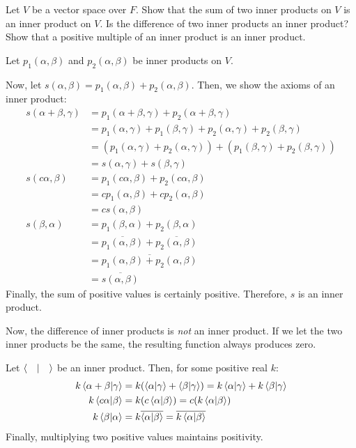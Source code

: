 \documentclass[notes]{agony}
\begin{document}
\begin{xca}
  Let $V$ be a vector space over $F$.
  Show that the sum of two inner products on $V$ is an inner product on $V$.
  Is the difference of two inner products an inner product?
  Show that a positive multiple of an inner product is an inner product.
\end{xca}
\begin{prf}
  Let $p_1(\alpha,\beta)$ and $p_2(\alpha,\beta)$ be inner products on $V$.

  Now, let $s(\alpha,\beta) = p_1(\alpha, \beta) + p_2(\alpha, \beta)$.
  Then, we show the axioms of an inner product:
  \begin{align*}
    s(\alpha+\beta,\gamma)
     & = p_1(\alpha+\beta,\gamma)+p_2(\alpha+\beta,\gamma)                                   \\
     & = p_1(\alpha,\gamma) + p_1(\beta,\gamma) + p_2(\alpha,\gamma) + p_2(\beta,\gamma)     \\
     & = (p_1(\alpha,\gamma) + p_2(\alpha,\gamma)) + (p_1(\beta,\gamma) + p_2(\beta,\gamma)) \\
     & = s(\alpha,\gamma) + s(\beta,\gamma)                                                  \\
    s(c\alpha, \beta)
     & = p_1(c\alpha, \beta) + p_2(c\alpha, \beta)                                           \\
     & = cp_1(\alpha,\beta) + cp_2(\alpha,\beta)                                             \\
     & = cs(\alpha,\beta)                                                                    \\
    s(\beta,\alpha)
     & = p_1(\beta,\alpha) + p_2(\beta,\alpha)                                               \\
     & = \overline{p_1(\alpha,\beta)} + \overline{p_2(\alpha,\beta)}                         \\
     & = \overline{p_1(\alpha,\beta) + p_2(\alpha,\beta)}                                    \\
     & = \overline{s(\alpha,\beta)}
  \end{align*}
  Finally, the sum of positive values is certainly positive.
  Therefore, $s$ is an inner product.

  Now, the difference of inner products is \emph{not} an inner product.
  If we let the two inner products be the same, the resulting function always produces zero.

  Let $\ip{\quad}$ be an inner product.
  Then, for some positive real $k$:
  \begin{align*}
    k\ip{\alpha+\beta}{\gamma} & = k(\ip{\alpha}{\gamma}+\ip{\beta}{\gamma}) = k\ip{\alpha}{\gamma} + k\ip{\beta}{\gamma} \\
    k\ip{c\alpha}{\beta}       & = k(c\ip{\alpha}{\beta}) = c(k\ip{\alpha}{\beta})                                        \\
    k\ip{\beta}{\alpha}        & = k\overline{\ip{\alpha}{\beta}} = \overline{k\ip{\alpha}{\beta}}
  \end{align*}
  Finally, multiplying two positive values maintains positivity.
\end{prf}
\end{document}
